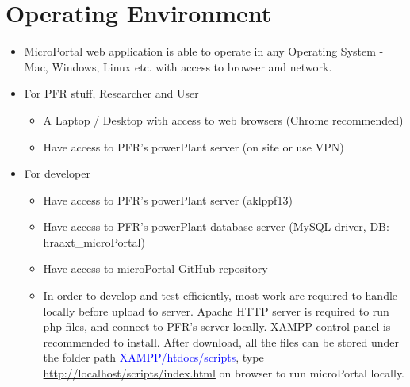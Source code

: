 \documentclass{scrreprt}
\begin{document}
\section{Operating Environment}
 \begin{itemize}
 \item MicroPortal web application is able to operate in any Operating System - Mac, Windows, Linux etc. with access to browser and network.
 \item For PFR stuff, Researcher and User
 \begin{itemize}
 \item A Laptop / Desktop with access to web browsers (Chrome recommended)
 \item Have access to PFR's powerPlant server (on site or use VPN)
 \end{itemize}
 \item For developer
 \begin{itemize}
 \item Have access to PFR's powerPlant server (aklppf13)
 \item Have access to PFR's powerPlant database server (MySQL driver, DB: hraaxt\_microPortal)
 \item Have access to microPortal GitHub repository
 \item In order to develop and test efficiently, most work are required to handle locally before upload to server. Apache HTTP server is required to run php files, and connect to PFR's server locally. XAMPP control panel is recommended to install. After download, all the files can be stored under the folder path  \textcolor{blue}{XAMPP/htdocs/scripts}, type \url{http://localhost/scripts/index.html} on browser to run microPortal locally.
 \end{itemize}
 \end{itemize}
\end{document}
